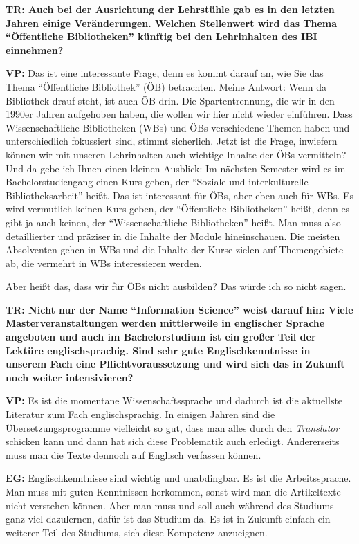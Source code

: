 \documentclass[a4paper,
fontsize=11pt,
oneside,
numbers=noperiodatend,
parskip=half-,
bibliography=totoc,
final
]{scrartcl}
\begin{document}
\textbf{TR: Auch bei der Ausrichtung der Lehrstühle gab es in den
letzten Jahren einige Veränderungen. Welchen Stellenwert wird das Thema
\enquote{Öffentliche Bibliotheken} künftig bei den Lehrinhalten des IBI
einnehmen?}

\textbf{VP:} Das ist eine interessante Frage, denn es kommt darauf an,
wie Sie das Thema \enquote{Öffentliche Bibliothek} (ÖB) betrachten.
Meine Antwort: Wenn da Bibliothek drauf steht, ist auch ÖB drin. Die
Spartentrennung, die wir in den 1990er Jahren aufgehoben haben, die
wollen wir hier nicht wieder einführen. Dass Wissenschaftliche
Bibliotheken (WBs) und ÖBs verschiedene Themen haben und unterschiedlich
fokussiert sind, stimmt sicherlich. Jetzt ist die Frage, inwiefern
können wir mit unseren Lehrinhalten auch wichtige Inhalte der ÖBs
vermitteln? Und da gebe ich Ihnen einen kleinen Ausblick: Im nächsten
Semester wird es im Bachelorstudiengang einen Kurs geben, der
\enquote{Soziale und interkulturelle Bibliotheksarbeit} heißt. Das ist
interessant für ÖBs, aber eben auch für WBs. Es wird vermutlich keinen
Kurs geben, der \enquote{Öffentliche Bibliotheken} heißt, denn es gibt
ja auch keinen, der \enquote{Wissenschaftliche Bibliotheken} heißt. Man
muss also detaillierter und präziser in die Inhalte der Module
hineinschauen. Die meisten Absolventen gehen in WBs und die Inhalte der
Kurse zielen auf Themengebiete ab, die vermehrt in WBs interessieren
werden.

Aber heißt das, dass wir für ÖBs nicht ausbilden? Das würde ich so nicht
sagen.

\textbf{TR: Nicht nur der Name \enquote{Information Science} weist
darauf hin: Viele Masterveranstaltungen werden mittlerweile in
englischer Sprache angeboten und auch im Bachelorstudium ist ein großer
Teil der Lektüre englischsprachig. Sind sehr gute Englischkenntnisse in
unserem Fach eine Pflichtvoraussetzung und wird sich das in Zukunft noch
weiter intensivieren?}

\textbf{VP:} Es ist die momentane Wissenschaftssprache und dadurch ist
die aktuellste Literatur zum Fach englischsprachig. In einigen Jahren
sind die Übersetzungsprogramme vielleicht so gut, dass man alles durch
den \emph{Translator} schicken kann und dann hat sich diese Problematik
auch erledigt. Andererseits muss man die Texte dennoch auf Englisch
verfassen können.

\textbf{EG:} Englischkenntnisse sind wichtig und unabdingbar. Es ist
{die} Arbeitssprache. Man muss mit guten Kenntnissen herkommen, sonst
wird man die Artikeltexte nicht verstehen können. Aber man muss und soll
auch während des Studiums ganz viel dazulernen, dafür ist das Studium
da. Es ist in Zukunft einfach ein weiterer Teil des Studiums, sich diese
Kompetenz anzueignen.
\end{document}
